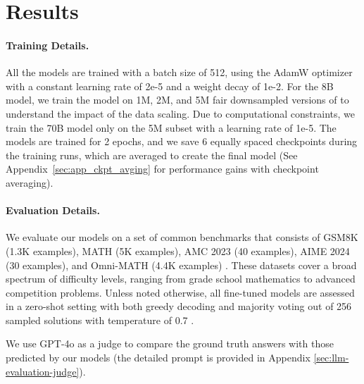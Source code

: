 \section{Results}







\paragraph{Training Details.}
All the models are trained with a batch size of 512, using the AdamW optimizer~\citep{Loshchilov2019DecoupledWD} with a constant learning rate of 2e-5 and a weight decay of 1e-2. 
For the 8B model, we train the model on 1M, 2M, and 5M fair downsampled versions of \dataset to understand the impact of the data scaling.  
Due to computational constraints, we train the 70B model only on the 5M subset with a learning rate of 1e-5. 
The models are trained for 2 epochs, and we save 6 equally spaced checkpoints during the training runs, which are averaged to create the final model (See Appendix~\ref{sec:app_ckpt_avging} for performance gains with checkpoint averaging). 


\paragraph{Evaluation Details.} 
We evaluate our models on a set of common benchmarks that consists of GSM8K (1.3K examples), MATH (5K examples), AMC 2023 (40 examples), AIME 2024 (30 examples), and Omni-MATH (4.4K examples) \citep{omni_math}. These datasets cover a broad spectrum of difficulty levels, ranging from grade school mathematics to advanced competition problems. Unless noted otherwise, all fine-tuned models are assessed in a zero-shot setting with both greedy decoding and majority voting out of 256 sampled solutions with temperature of 0.7 \citep{wang2022self}.

We use GPT-4o \citep{openai2023gpt4} as a judge to compare the ground truth answers with those predicted by our models (the detailed prompt is provided in Appendix \ref{sec:llm-evaluation-judge}). 







